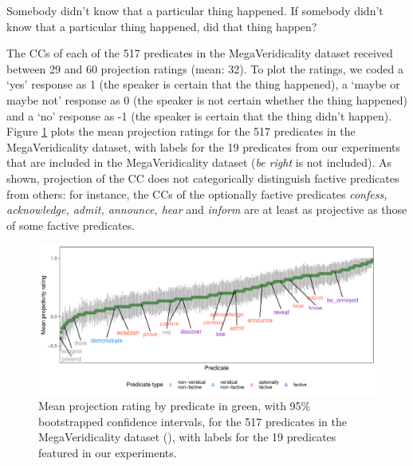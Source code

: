 \documentclass[11pt,fleqn]{article}
\newcommand{\6}{\mbox{$[\hspace*{-.6mm}[$}}
\newcommand{\9}{\mbox{$]\hspace*{-.6mm}]$}}
\begin{document}
\begin{exe}
\ex\label{wr-stim-proj}
\begin{xlist}
\ex Somebody didn't know that a particular thing happened.
\ex If somebody didn't know that a particular thing happened, did that thing happen?
\end{xlist}
\end{exe}

The CCs of each of the 517 predicates in the MegaVeridicality dataset received between 29 and 60 projection ratings (mean: 32). To plot the ratings, we coded a `yes' response as 1 (the speaker is certain that the thing happened),  a `maybe or maybe not' response as 0 (the speaker is not certain whether the thing happened) and a `no' response as -1 (the speaker is certain that the thing didn't happen). Figure \ref{f-white-rawlins-projectivity} plots the mean projection ratings for the 517 predicates in the MegaVeridicality dataset, with labels for the 19 predicates from our experiments that are included in the MegaVeridicality dataset ({\em be right} is not included). As shown, projection of the CC does not categorically distinguish factive predicates from others: for instance, the CCs of the optionally factive predicates {\em confess, acknowledge, admit, announce, hear} and {\em inform} are at least as projective as those of some factive predicates. 

\begin{figure}[H]
\centering
\includegraphics[width=.77\paperwidth]{../../MegaVeridicality-analysis/graphs/means-projection-by-predicate}

\caption{Mean projection rating by predicate in green, with 95\% bootstrapped confidence intervals, for the 517 predicates in the MegaVeridicality dataset (\citealt{white-rawlins-nels2018,white-etal2018b}), with labels for the 19 predicates featured in our experiments.}
\label{f-white-rawlins-projectivity}
\end{figure}
\end{document}
